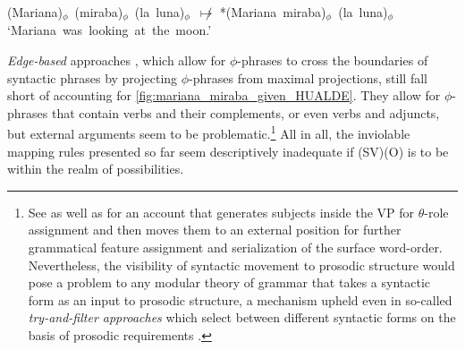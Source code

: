 %	
%	


\begin{exe}
\ex\label{ex:restructuringexamplesMARIANA} 
(Mariana)$_\phi$~(miraba)$_\phi$~(la~luna)$_\phi$~$\not\longmapsto$ *(Mariana~miraba)$_\phi$~(la~luna)$_\phi$ 
\glt `Mariana~was~looking~at~the~moon.' 
\end{exe}

\textit{Edge-based} approaches \citep{Chen.1987,Chen.2000}, which allow for 
$\phi$-phrases to cross the boundaries of syntactic phrases by projecting 
$\phi$-phrases from maximal projections, still fall short of accounting 
for  \autoref{fig:mariana_miraba_given_HUALDE}. They allow for 
$\phi$-phrases that contain verbs and their complements, or even verbs and 
adjuncts, but external arguments seem to be problematic.\footnote{See 
\citet{KoopmanSportiche.1991} as well as 
\citet[75--80]{Gabriel_Mueller_Fischer.2018} for an account that generates 
subjects inside the \ac{VP} for $\theta$-role assignment and then moves 
them to an external position for further grammatical feature assignment 
and serialization of the surface word-order. Nevertheless, the visibility 
of syntactic movement to prosodic structure would pose a problem to any 
modular theory of grammar that takes a syntactic form as an input to 
prosodic structure, a mechanism upheld even in so-called 
\textit{try-and-filter approaches} which select between different syntactic 
forms on the basis of prosodic requirements \citep[872--873]{Buring.2013}.} All in all, the inviolable mapping rules presented so far seem 
descriptively inadequate if (SV)(O) is to be within the realm of 
possibilities.


